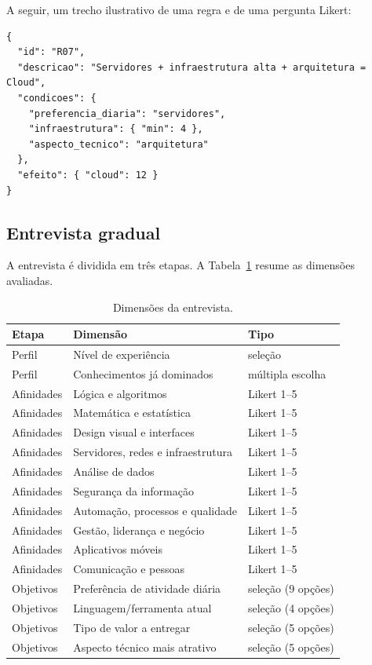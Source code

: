 \documentclass[12pt,a4paper]{article}
\begin{document}
A seguir, um trecho ilustrativo de uma regra e de uma pergunta Likert:

\noindent\begin{minipage}{\linewidth}
\begin{lstlisting}[caption={Trecho da base de conhecimento (JSON).}]
{
  "id": "R07",
  "descricao": "Servidores + infraestrutura alta + arquitetura = Cloud",
  "condicoes": {
    "preferencia_diaria": "servidores",
    "infraestrutura": { "min": 4 },
    "aspecto_tecnico": "arquitetura"
  },
  "efeito": { "cloud": 12 }
}
\end{lstlisting}
\end{minipage}

\subsection{Entrevista gradual}

A entrevista \'e dividida em tr\^es etapas. A Tabela~\ref{tab:perguntas} resume as
dimens\~oes avaliadas.

\begin{table}[htbp]
\centering
\caption{Dimens\~oes da entrevista.}
\label{tab:perguntas}
\begin{tabular}{@{}lll@{}}
\toprule
Etapa & Dimens\~ao & Tipo \\
\midrule
Perfil     & N\'ivel de experi\^encia            & sele\c{c}\~ao \\
Perfil     & Conhecimentos j\'a dominados        & m\'ultipla escolha \\
Afinidades & L\'ogica e algoritmos               & Likert 1--5 \\
Afinidades & Matem\'atica e estat\'istica        & Likert 1--5 \\
Afinidades & Design visual e interfaces         & Likert 1--5 \\
Afinidades & Servidores, redes e infraestrutura & Likert 1--5 \\
Afinidades & An\'alise de dados                 & Likert 1--5 \\
Afinidades & Seguran\c{c}a da informa\c{c}\~ao   & Likert 1--5 \\
Afinidades & Automa\c{c}\~ao, processos e qualidade & Likert 1--5 \\
Afinidades & Gest\~ao, lideran\c{c}a e neg\'ocio & Likert 1--5 \\
Afinidades & Aplicativos m\'oveis               & Likert 1--5 \\
Afinidades & Comunica\c{c}\~ao e pessoas        & Likert 1--5 \\
Objetivos  & Prefer\^encia de atividade di\'aria & sele\c{c}\~ao (9 op\c{c}\~oes) \\
Objetivos  & Linguagem/ferramenta atual          & sele\c{c}\~ao (4 op\c{c}\~oes) \\
Objetivos  & Tipo de valor a entregar            & sele\c{c}\~ao (5 op\c{c}\~oes) \\
Objetivos  & Aspecto t\'ecnico mais atrativo     & sele\c{c}\~ao (5 op\c{c}\~oes) \\
\bottomrule
\end{tabular}
\end{table}
\end{document}
